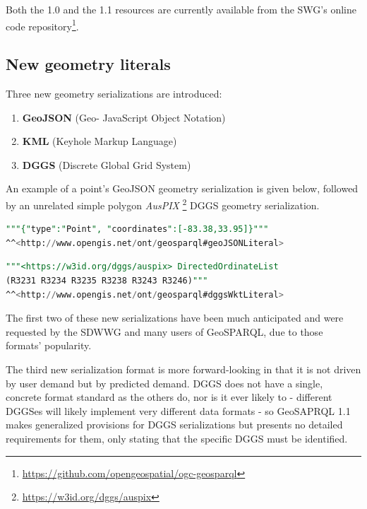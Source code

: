 \documentclass[runningheads]{llncs}
\begin{document}
Both the 1.0 and the 1.1 resources are currently available from the SWG's online code repository\footnote{\url{https://github.com/opengeospatial/ogc-geosparql}}.


\subsection{New geometry literals}\label{sec:newliterals}
Three new geometry serializations are introduced: 

\begin{enumerate}
    \item \textbf{GeoJSON} (Geo- JavaScript Object Notation)\cite{butler2016geojson}
    \item \textbf{KML} (Keyhole Markup Language)\cite{nolan2014keyhole} 
    \item \textbf{DGGS} (Discrete Global Grid System)\cite{sahr1998discrete}
\end{enumerate} 

An example of a point's GeoJSON geometry serialization is given below, followed by an unrelated simple polygon \textit{AusPIX}
\footnote{\url{https://w3id.org/dggs/auspix}} DGGS geometry serialization.

\small
\begin{lstlisting}[caption=GeoJSON geometry serialization example,label=lst:geojsonliteral,language=sql,frame=single,basicstyle=\ttfamily,showstringspaces=false]
"""{"type":"Point", "coordinates":[-83.38,33.95]}"""
^^<http://www.opengis.net/ont/geosparql#geoJSONLiteral>
\end{lstlisting}

\begin{lstlisting}[caption=AusPIX DGGS geometry serialization example,label=lst:geodggsWktliteral,language=sql,frame=single,basicstyle=\ttfamily,showstringspaces=false]
"""<https://w3id.org/dggs/auspix> DirectedOrdinateList 
(R3231 R3234 R3235 R3238 R3243 R3246)"""
^^<http://www.opengis.net/ont/geosparql#dggsWktLiteral>
\end{lstlisting}
\normalsize

The first two of these new serializations have been much anticipated and were requested by the SDWWG and many users of 
GeoSPARQL, due to those formats' popularity.

The third new serialization format is more forward-looking in that it is not driven by user demand but by predicted demand.
DGGS does not have a single, concrete format standard as the others do, nor is it ever likely to - different DGGSes will 
likely implement very different data formats - so GeoSAPRQL 1.1 makes generalized provisions for DGGS serializations but 
presents no detailed requirements for them, only stating that the specific DGGS must be identified.
\end{document}
